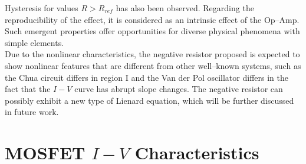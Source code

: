 \documentclass[%
 aip,
amsmath,amssymb,
reprint,
]{revtex4-1}
\begin{document}
Hysteresis for values $R>R_{ref}$ has also been observed. Regarding the reproducibility of the effect, it is considered as an intrinsic effect of the Op--Amp. Such emergent properties offer opportunities for diverse physical phenomena with simple elements. \\

Due to the nonlinear characteristics, the negative resistor proposed is expected to show nonlinear features that are different from other well--known systems, such as the Chua circuit\cite{chua_circuit} differs in region I and the Van der Pol oscillator\cite{VanDerPol} differs in the fact that the $I-V$ curve has abrupt slope changes. The negative resistor can possibly exhibit a new type of Lienard equation, which will be further discussed in future work. 



\appendix

\section{\label{mosfetiv}MOSFET $I-V$ Characteristics}
\end{document}
